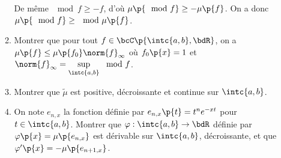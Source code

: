 \documentclass[a4paper,french,bookmarks]{article}
\begin{document}
\begin{enumerate}
\begin{enumerate}
{                De même $\mod{f} \geq -f$, d'où $\mu\p{\mod f} \geq -\mu\p{f}$. On a donc $\mu\p{\mod{f}} \geq \mod{\mu\p{f}}$.
            }
            
            \item Montrer que pour tout $f \in \bcC\p{\intc{a, b}, \bdR}$, on a $\mu\p{f} \leq \mu\p{f_0}\norm{f}_\infty$ où $f_0\p{x} = 1$ et $\norm{f}_\infty = \sup\limits_{\intc{a, b}} \mod{f}$.
            
            
            \item Montrer que $\widetilde{\mu}$ est positive, décroissante et continue sur $\intc{a, b}$.
            
            
            \item On note $e_{n, x}$ la fonction définie par $e_{n, x}\p{t} = t^ne^{-xt}$ pour $t \in \intc{a, b}$. Montrer que $\varphi : \intc{a, b} \to \bdR$ définie par $\varphi\p{x} = \mu\p{e_{n, x}}$ est dérivable sur $\intc{a, b}$, décroissante, et que $\varphi'\p{x} = -\mu\p{e_{n+1, x}}$.
            

\end{enumerate}
\end{enumerate}
\end{document}
